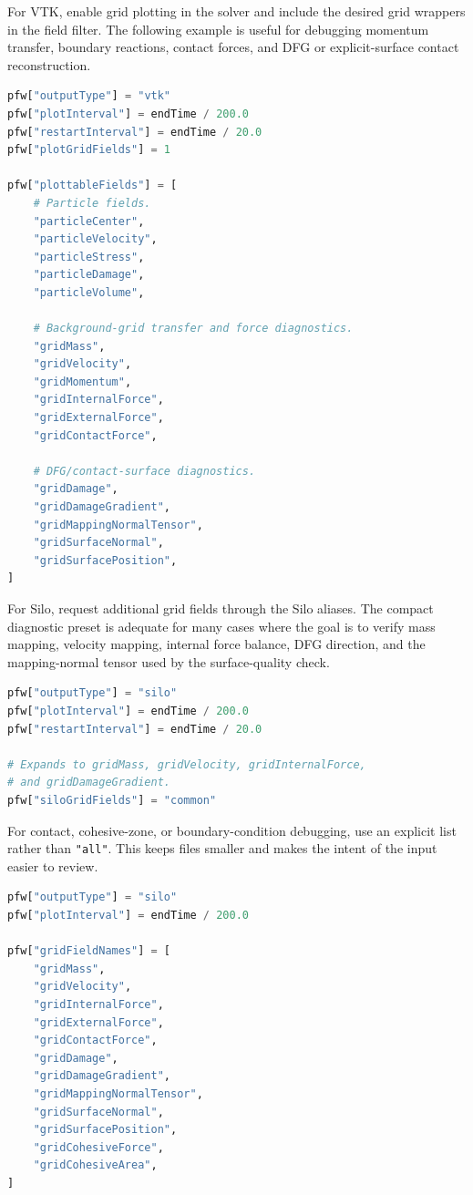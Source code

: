 For VTK, enable grid plotting in the solver and include the desired grid wrappers in the field filter.  The following example is useful for debugging momentum transfer, boundary reactions, contact forces, and DFG or explicit-surface contact reconstruction.

\begin{lstlisting}[language=Python,caption={VTK output with selected particle and grid diagnostics.}]
pfw["outputType"] = "vtk"
pfw["plotInterval"] = endTime / 200.0
pfw["restartInterval"] = endTime / 20.0
pfw["plotGridFields"] = 1

pfw["plottableFields"] = [
    # Particle fields.
    "particleCenter",
    "particleVelocity",
    "particleStress",
    "particleDamage",
    "particleVolume",

    # Background-grid transfer and force diagnostics.
    "gridMass",
    "gridVelocity",
    "gridMomentum",
    "gridInternalForce",
    "gridExternalForce",
    "gridContactForce",

    # DFG/contact-surface diagnostics.
    "gridDamage",
    "gridDamageGradient",
    "gridMappingNormalTensor",
    "gridSurfaceNormal",
    "gridSurfacePosition",
]
\end{lstlisting}

For Silo, request additional grid fields through the Silo aliases.  The compact diagnostic preset is adequate for many cases where the goal is to verify mass mapping, velocity mapping, internal force balance, DFG direction, and the mapping-normal tensor used by the surface-quality check.

\begin{lstlisting}[language=Python,caption={Silo output with the common grid-diagnostic preset.}]
pfw["outputType"] = "silo"
pfw["plotInterval"] = endTime / 200.0
pfw["restartInterval"] = endTime / 20.0

# Expands to gridMass, gridVelocity, gridInternalForce,
# and gridDamageGradient.
pfw["siloGridFields"] = "common"
\end{lstlisting}

For contact, cohesive-zone, or boundary-condition debugging, use an explicit list rather than \texttt{"all"}.  This keeps files smaller and makes the intent of the input easier to review.

\begin{lstlisting}[language=Python,caption={Silo output with explicit contact/cohesive grid diagnostics.}]
pfw["outputType"] = "silo"
pfw["plotInterval"] = endTime / 200.0

pfw["gridFieldNames"] = [
    "gridMass",
    "gridVelocity",
    "gridInternalForce",
    "gridExternalForce",
    "gridContactForce",
    "gridDamage",
    "gridDamageGradient",
    "gridMappingNormalTensor",
    "gridSurfaceNormal",
    "gridSurfacePosition",
    "gridCohesiveForce",
    "gridCohesiveArea",
]
\end{lstlisting}

